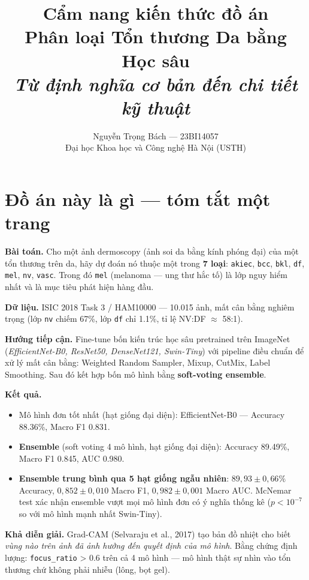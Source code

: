 \documentclass[11pt,a4paper]{article}
\title{
  \vspace{-1.5cm}
  \color{usthblue}\Huge\textbf{Cẩm nang kiến thức đồ án} \\[6pt]
  \color{black!75}\large Phân loại Tổn thương Da bằng Học sâu \\[2pt]
  \normalsize\textit{Từ định nghĩa cơ bản đến chi tiết kỹ thuật}
}
\author{
  Nguyễn Trọng Bách --- 23BI14057 \\[2pt]
  \small Đại học Khoa học và Công nghệ Hà Nội (USTH)
}
\date{}
\begin{document}
\maketitle
\vspace{-1cm}

{\hypersetup{linkcolor=black}\tableofcontents}

\newpage

\section{Đồ án này là gì --- tóm tắt một trang}

\textbf{Bài toán.} Cho một ảnh dermoscopy (ảnh soi da bằng kính phóng đại) của một tổn thương trên da, hãy dự đoán nó thuộc một trong \textbf{7 loại}: \texttt{akiec}, \texttt{bcc}, \texttt{bkl}, \texttt{df}, \texttt{mel}, \texttt{nv}, \texttt{vasc}. Trong đó \texttt{mel} (melanoma --- ung thư hắc tố) là lớp nguy hiểm nhất và là mục tiêu phát hiện hàng đầu.

\textbf{Dữ liệu.} ISIC 2018 Task 3 / HAM10000 --- 10.015 ảnh, mất cân bằng nghiêm trọng (lớp \texttt{nv} chiếm 67\%, lớp \texttt{df} chỉ 1.1\%, tỉ lệ NV:DF $\approx$ 58:1).

\textbf{Hướng tiếp cận.} Fine-tune bốn kiến trúc học sâu pretrained trên ImageNet (\textit{EfficientNet-B0, ResNet50, DenseNet121, Swin-Tiny}) với pipeline điều chuẩn để xử lý mất cân bằng: Weighted Random Sampler, Mixup, CutMix, Label Smoothing. Sau đó kết hợp bốn mô hình bằng \textbf{soft-voting ensemble}.

\textbf{Kết quả.}
\begin{itemize}[leftmargin=*]
  \item Mô hình đơn tốt nhất (hạt giống đại diện): EfficientNet-B0 --- Accuracy 88.36\%, Macro F1 0.831.
  \item \textbf{Ensemble} (soft voting 4 mô hình, hạt giống đại diện): Accuracy 89.49\%, Macro F1 0.845, AUC 0.980.
  \item \textbf{Ensemble trung bình qua 5 hạt giống ngẫu nhiên}: $89{,}93 \pm 0{,}66\%$ Accuracy, $0{,}852 \pm 0{,}010$ Macro F1, $0{,}982 \pm 0{,}001$ Macro AUC. McNemar test xác nhận ensemble vượt mọi mô hình đơn có ý nghĩa thống kê ($p < 10^{-7}$ so với mô hình mạnh nhất Swin-Tiny).
\end{itemize}

\textbf{Khả diễn giải.} Grad-CAM (Selvaraju et al., 2017) tạo bản đồ nhiệt cho biết \textit{vùng nào trên ảnh đã ảnh hưởng đến quyết định của mô hình}. Bằng chứng định lượng: \texttt{focus\_ratio} > 0.6 trên cả 4 mô hình --- mô hình thật sự nhìn vào tổn thương chứ không phải nhiễu (lông, bọt gel).
\end{document}
